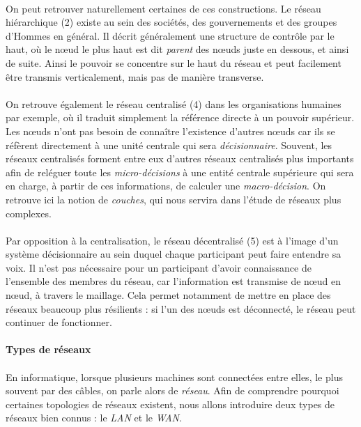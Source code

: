 \paragraph{} On peut retrouver naturellement certaines de ces constructions. Le réseau hiérarchique (2) existe
au sein des sociétés, des gouvernements et des groupes d'Hommes en général. Il décrit généralement une structure
de contrôle par le haut, où le n\oe{}ud le plus haut est dit \emph{parent} des n\oe{}uds juste en dessous, et ainsi de suite.
Ainsi le pouvoir se concentre sur le haut du réseau et peut facilement être transmis verticalement, mais pas de 
manière transverse.

\paragraph{} On retrouve également le réseau centralisé (4) dans les organisations humaines par exemple,
où il traduit simplement la référence directe à un pouvoir supérieur. Les n\oe{}uds n'ont pas besoin de connaître
l'existence d'autres n\oe{}uds car ils se réfèrent directement à une unité centrale qui sera \emph{décisionnaire}.
Souvent, les réseaux centralisés forment entre eux d'autres réseaux centralisés plus importants afin de reléguer
toute les \emph{micro-décisions} à une entité centrale supérieure qui sera en charge, à partir de ces informations,
de calculer une \emph{macro-décision}. On retrouve ici la notion de \emph{couches}, qui nous servira dans l'étude
de réseaux plus complexes.

\paragraph{} Par opposition à la centralisation, le réseau décentralisé (5) est à l'image d'un système décisionnaire au
sein duquel chaque participant peut faire entendre sa voix. Il n'est pas nécessaire pour un participant d'avoir connaissance
de l'ensemble des membres du réseau, car l'information est transmise de n\oe{}ud en n\oe{}ud, à travers le maillage.
Cela permet notamment de mettre en place des réseaux beaucoup plus résilients : si l'un des n\oe{}uds est déconnecté,
le réseau peut continuer de fonctionner.


\paragraph{Types de réseaux}

\paragraph{} En informatique, lorsque plusieurs machines sont connectées entre elles, le plus souvent par des câbles, on
parle alors de \emph{réseau}. Afin de comprendre pourquoi certaines topologies de réseaux existent, nous allons introduire 
deux types de réseaux bien connus : le \emph{LAN} et le \emph{WAN}.

